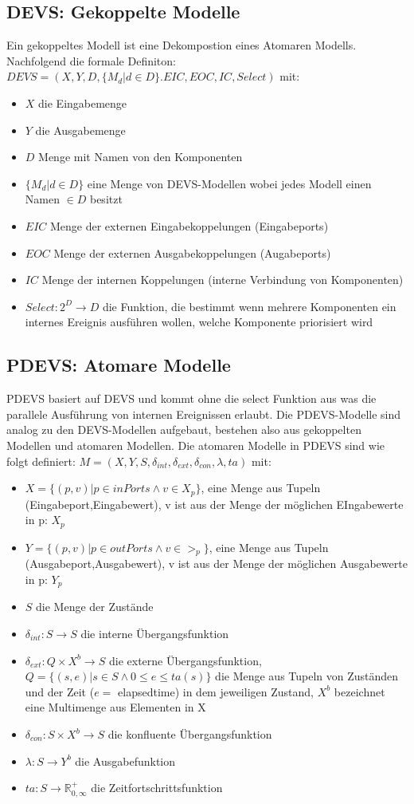 \documentclass[11pt, fleqn, a4paper, leqno]{scrartcl} %
\begin{document}
	\subsection{DEVS: Gekoppelte Modelle}
		Ein gekoppeltes Modell ist eine Dekompostion eines Atomaren Modells. Nachfolgend die formale Definiton: $DEVS = (X,Y,D,\{M_{d}|d \in D\}.EIC,EOC,IC,Select)$ mit:
		\begin{itemize}
			\item $X$ die Eingabemenge
			\item $Y$ die Ausgabemenge
			\item $D$ Menge mit Namen von den Komponenten
			\item $\{M_{d}|d \in D\}$ eine Menge von DEVS-Modellen wobei jedes Modell einen Namen $\in D$ besitzt
			\item $EIC$ Menge der externen Eingabekoppelungen (Eingabeports)
			\item $EOC$ Menge der externen Ausgabekoppelungen (Augabeports)
			\item $IC$ Menge der internen Koppelungen (interne Verbindung von Komponenten)
			\item $Select: 2^{D} \rightarrow D$ die Funktion, die bestimmt wenn mehrere Komponenten ein internes Ereignis ausführen wollen, welche Komponente priorisiert wird
		\end{itemize}
	\subsection{PDEVS: Atomare Modelle}
	PDEVS basiert auf DEVS und kommt ohne die select Funktion aus was die parallele Ausführung von internen Ereignissen erlaubt. Die PDEVS-Modelle sind analog zu den DEVS-Modellen aufgebaut, bestehen also aus gekoppelten Modellen und atomaren Modellen. Die atomaren Modelle in PDEVS sind wie folgt definiert: $M=(X,Y,S,\delta_{int},\delta_{ext},\delta_{con},\lambda,ta)$ mit:
	\begin{itemize}
		\item $X = \{(p,v)|p \in inPorts \wedge v \in X_{p}\}$, eine Menge aus Tupeln (Eingabeport,Eingabewert), v ist aus der Menge der möglichen EIngabewerte in p: $X_{p}$
		\item $Y = \{(p,v)|p \in outPorts \wedge v \in >_{p}\}$, eine Menge aus Tupeln (Ausgabeport,Ausgabewert), v ist aus der Menge der möglichen Ausgabewerte in p: $Y_{p}$
		\item $S$ die Menge der Zustände
		\item $\delta_{int}: S \rightarrow S$ die interne Übergangsfunktion
		\item $\delta_{ext}: Q \times X^{b}  \rightarrow S$ die externe Übergangsfunktion, $Q=\{(s,e)|s \in S \wedge 0 \leq e \le ta(s)\}$ die Menge aus Tupeln von Zuständen und der Zeit ($e = $ elapsedtime) in dem jeweiligen Zustand, $X^{b}$ bezeichnet eine Multimenge aus Elementen in X
		\item $\delta_{con}: S \times X^{b} \rightarrow S$ die konfluente Übergangsfunktion
		\item $\lambda: S \rightarrow Y^{b}$ die Ausgabefunktion
		\item $ta: S \rightarrow \mathds{R}^{+}_{0,\infty}$ die Zeitfortschrittsfunktion
	\end{itemize}
\end{document}
